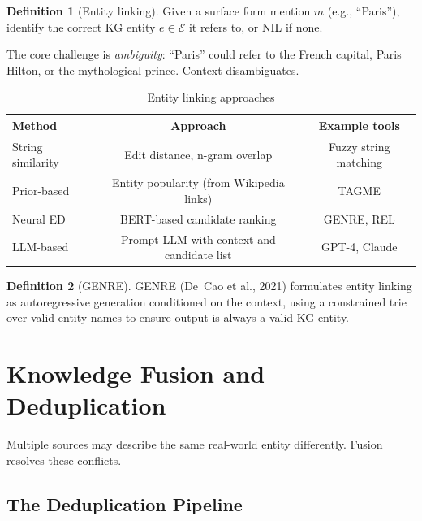 \documentclass[11pt,a4paper,oneside,openany]{book}
\theoremstyle{definition}
\newtheorem{definition}{Definition}[chapter]
\theoremstyle{plain}
\theoremstyle{remark}
\newcommand{\cE}{\mathcal{E}}
\begin{document}
\begin{definition}[Entity linking]
	Given a surface form mention $m$ (e.g., ``Paris''), identify the correct KG entity $e \in \cE$ it refers to, or NIL if none.
\end{definition}

The core challenge is \emph{ambiguity}: ``Paris'' could refer to the French capital, Paris Hilton, or the mythological prince. Context disambiguates.

\begin{table}[h]
	\centering
	\caption{Entity linking approaches}
	\label{tab:el}
	\begin{tabular}{lcc}
		\toprule
		Method            & Approach                                   & Example tools         \\
		\midrule
		String similarity & Edit distance, n-gram overlap              & Fuzzy string matching \\
		Prior-based       & Entity popularity (from Wikipedia links)   & TAGME                 \\
		Neural ED         & BERT-based candidate ranking               & GENRE, REL            \\
		LLM-based         & Prompt LLM with context and candidate list & GPT-4, Claude         \\
		\bottomrule
	\end{tabular}
\end{table}

\begin{definition}[GENRE]
	GENRE (De~Cao et al., 2021) formulates entity linking as autoregressive generation conditioned on the context, using a constrained trie over valid entity names to ensure output is always a valid KG entity.
\end{definition}

\section{Knowledge Fusion and Deduplication}\label{sec:fusion}

Multiple sources may describe the same real-world entity differently. Fusion resolves these conflicts.

\subsection{The Deduplication Pipeline}
\end{document}
